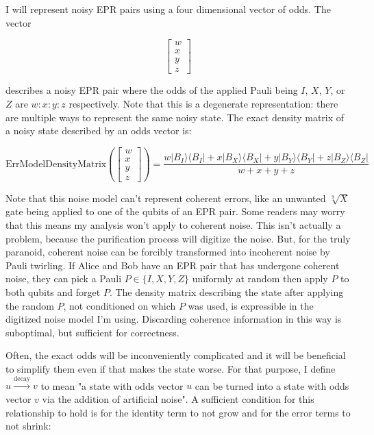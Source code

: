 \documentclass[onecolumn,unpublished,a4paper]{quantumarticle}
\theoremstyle{definition}
\theoremstyle{definition}
\theoremstyle{definition}
\begin{document}
I will represent noisy EPR pairs using a four dimensional vector of odds. The vector

$$\begin{bmatrix}w \\ x \\ y \\ z\end{bmatrix}$$

describes a noisy EPR pair where the odds of the applied Pauli being $I$, $X$, $Y$, or $Z$ are $w:x:y:z$ respectively.
Note that this is a degenerate representation: there are multiple ways to represent the same noisy state.
The exact density matrix of a noisy state described by an odds vector is:

\begin{equation}
\text{ErrModelDensityMatrix}\left(\begin{bmatrix}w\\x\\y\\z\end{bmatrix}\right) = \frac{w|B_I\rangle\langle B_I| + x|B_X\rangle\langle B_X| + y|B_Y\rangle\langle B_Y| + z|B_Z\rangle\langle B_Z|}{w+x+y+z}
\end{equation}

Note that this noise model can't represent coherent errors, like an unwanted $\sqrt[9]{X}$ gate being applied to one of the qubits of an EPR pair.
Some readers may worry that this means my analysis won't apply to coherent noise.
This isn't actually a problem, because the purification process will digitize the noise.
But, for the truly paranoid, coherent noise can be forcibly transformed into incoherent noise by Pauli twirling.
If Alice and Bob have an EPR pair that has undergone coherent noise, they can pick a Pauli $P \in \{I,X,Y,Z\}$ uniformly at random then apply $P$ to both qubits and forget $P$.
The density matrix describing the state after applying the random $P$, not conditioned on which $P$ was used, is expressible in the digitized noise model I'm using.
Discarding coherence information in this way is suboptimal, but sufficient for correctness.

Often, the exact odds will be inconveniently complicated and it will be beneficial to simplify them even if that makes the state worse.
For that purpose, I define $u \xrightarrow{\text{decay}} v$ to mean "a state with odds vector $u$ can be turned into a state with odds vector $v$ via the addition of artificial noise".
A sufficient condition for this relationship to hold is for the identity term to not grow and for the error terms to not shrink:
\end{document}
